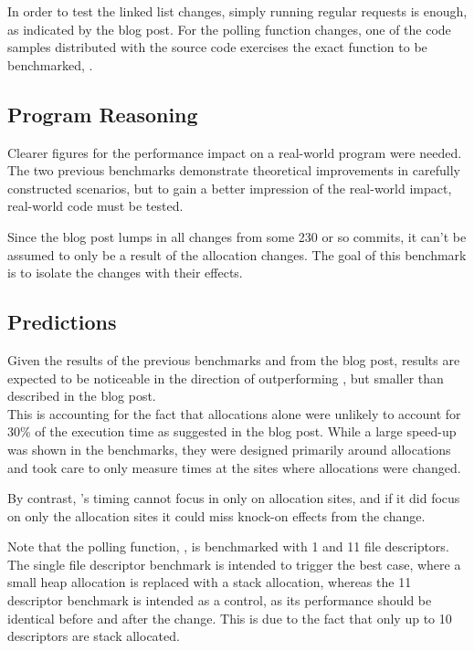 In order to test the linked list changes, simply running regular  requests is enough, as indicated by the blog post. For the polling function changes, one of the code samples distributed with the  source code exercises the exact function to be benchmarked, .

\subsection{Program Reasoning}

Clearer figures for the performance impact on a real-world program were needed. The two previous benchmarks demonstrate theoretical improvements in carefully constructed scenarios, but to gain a better impression of the real-world impact, real-world code must be tested.

Since the blog post lumps in all changes from some 230 or so commits, it can't be assumed to only be a result of the allocation changes. The goal of this benchmark is to isolate the changes with their effects.

\subsection{Predictions}

Given the results of the previous benchmarks and from the blog post, results are expected to be noticeable in the direction of outperforming \malloc{}, but smaller than described in the blog post.\\
This is accounting for the fact that allocations alone were unlikely to account for 30\% of the execution time as suggested in the blog post. While a large speed-up was shown in the benchmarks, they were designed primarily around allocations and took care to only measure times at the sites where allocations were changed.

By contrast, 's timing cannot focus in only on allocation sites, and if it did focus on only the allocation sites it could miss knock-on effects from the change.

Note that the polling function, , is benchmarked with 1 and 11 file descriptors. The single file descriptor benchmark is intended to trigger the best case, where a small heap allocation is replaced with a stack allocation, whereas the 11 descriptor benchmark is intended as a control, as its performance should be identical before and after the change. This is due to the fact that only up to 10 descriptors are stack allocated.


